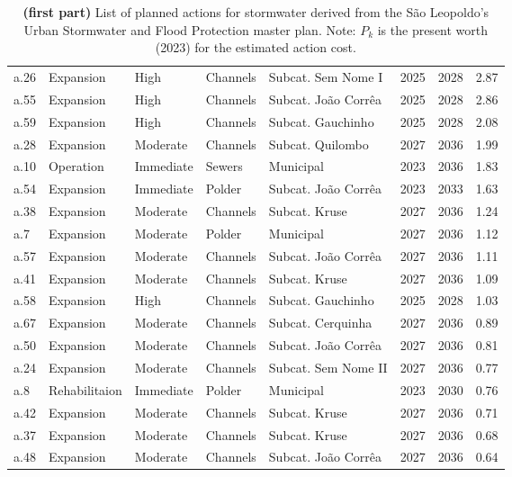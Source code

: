 \documentclass[11pt]{article}
\begin{document}
\begin{table}[t]
\begin{tabular}{lllllrrr}
a.26 &     Expansion &      High & Channels &  Subcat. Sem Nome I &   2025 & 2028 &  2.87 \\
a.55 &     Expansion &      High & Channels & Subcat. João Corrêa &   2025 & 2028 &  2.86 \\
a.59 &     Expansion &      High & Channels &   Subcat. Gauchinho &   2025 & 2028 &  2.08 \\
a.28 &     Expansion &  Moderate & Channels &    Subcat. Quilombo &   2027 & 2036 &  1.99 \\
a.10 &     Operation & Immediate &   Sewers &           Municipal &   2023 & 2036 &  1.83 \\
a.54 &     Expansion & Immediate &   Polder & Subcat. João Corrêa &   2023 & 2033 &  1.63 \\
a.38 &     Expansion &  Moderate & Channels &       Subcat. Kruse &   2027 & 2036 &  1.24 \\
 a.7 &     Expansion &  Moderate &   Polder &           Municipal &   2027 & 2036 &  1.12 \\
a.57 &     Expansion &  Moderate & Channels & Subcat. João Corrêa &   2027 & 2036 &  1.11 \\
a.41 &     Expansion &  Moderate & Channels &       Subcat. Kruse &   2027 & 2036 &  1.09 \\
a.58 &     Expansion &      High & Channels &   Subcat. Gauchinho &   2025 & 2028 &  1.03 \\
a.67 &     Expansion &  Moderate & Channels &   Subcat. Cerquinha &   2027 & 2036 &  0.89 \\
a.50 &     Expansion &  Moderate & Channels & Subcat. João Corrêa &   2027 & 2036 &  0.81 \\
a.24 &     Expansion &  Moderate & Channels & Subcat. Sem Nome II &   2027 & 2036 &  0.77 \\
 a.8 & Rehabilitaion & Immediate &   Polder &           Municipal &   2023 & 2030 &  0.76 \\
a.42 &     Expansion &  Moderate & Channels &       Subcat. Kruse &   2027 & 2036 &  0.71 \\
a.37 &     Expansion &  Moderate & Channels &       Subcat. Kruse &   2027 & 2036 &  0.68 \\
a.48 &     Expansion &  Moderate & Channels & Subcat. João Corrêa &   2027 & 2036 &  0.64 \\
\bottomrule
\end{tabular}
\caption{ \textbf{(first part)} List of planned actions for stormwater derived from the São Leopoldo's Urban Stormwater and Flood Protection master plan. Note: $P_k$ is the present worth (2023) for the estimated action cost.}
\label{tab:actions_1}
\end{table}
\end{document}
